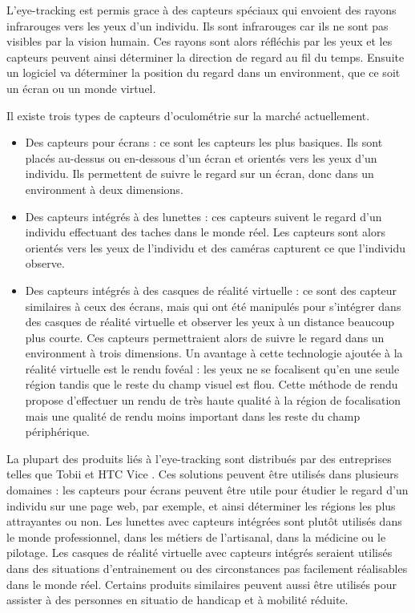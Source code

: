 \documentclass[12pt]{article}
\begin{document}
L'eye-tracking est permis grace à des capteurs spéciaux qui envoient des rayons
infrarouges vers les yeux d'un individu. Ils sont infrarouges car ils ne sont
pas visibles par la vision humain. Ces rayons sont alors réfléchis par les yeux
et les capteurs peuvent ainsi déterminer la direction de regard au fil du temps.
Ensuite un logiciel va déterminer la position du regard dans un environment, que
ce soit un écran ou un monde virtuel.

\bigskip
Il existe trois types de capteurs d'oculométrie sur la marché actuellement.
\begin{itemize}
  \item Des capteurs pour écrans : ce sont les capteurs les plus basiques. Ils
        sont placés au-dessus ou en-dessous d'un écran et orientés vers les yeux
        d'un individu. Ils permettent de suivre le regard sur un écran, donc
        dans un environment à deux dimensions.
  \item Des capteurs intégrés à des lunettes : ces capteurs suivent le regard
        d'un individu effectuant des taches dans le monde réel. Les capteurs
        sont alors orientés vers les yeux de l'individu et des caméras capturent
        ce que l'individu observe.
  \item Des capteurs intégrés à des casques de réalité virtuelle : ce sont des
        capteur similaires à ceux des écrans, mais qui ont été manipulés pour
        s'intégrer dans des casques de réalité virtuelle et observer les yeux à
        un distance beaucoup plus courte. Ces capteurs permettraient alors de
        suivre le regard dans un environment à trois dimensions. Un avantage à
        cette technologie ajoutée à la réalité virtuelle est le rendu fovéal
        \cite{wiki:foveated_rendering} : les yeux ne se focalisent qu'en une
        seule région tandis que le reste du champ visuel est flou. Cette méthode
        de rendu propose d'effectuer un rendu de très haute qualité à la région
        de focalisation mais une qualité de rendu moins important dans les reste
        du champ périphérique.
\end{itemize}

\bigskip
La plupart des produits liés à l'eye-tracking sont distribués par des
entreprises telles que Tobii \cite{tobii} et HTC Vice \cite{htc_vive_pro_eye}.
Ces solutions peuvent être utilisés dans plusieurs domaines \cite{yt:tobii_vr}
: les capteurs pour écrans peuvent être utile pour étudier le regard d'un
individu sur une page web, par exemple, et ainsi déterminer les régions les
plus attrayantes ou non. Les lunettes avec capteurs intégrées sont plutôt
utilisés dans le monde professionnel, dans les métiers de l'artisanal, dans la
médicine ou le pilotage. Les casques de réalité virtuelle avec capteurs
intégrés seraient utilisés dans des situations d'entrainement ou des
circonstances pas facilement réalisables dans le monde réel. Certains produits
similaires peuvent aussi être utilisés pour assister à des personnes en
situatio de handicap et à mobilité réduite.
\end{document}
